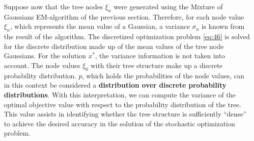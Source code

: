 Suppose now that the tree nodes $\xi_n$ were generated using the Mixture of Gaussians EM-algorithm of the previous section.
Therefore, for each node value $\xi_n$, which represents the mean value of a Gaussian, a variance $\sigma_n$ is known from the result of the algorithm.
The discretized optimization problem \eqref{eq:46} is solved for the discrete distribution made up of the mean values of the tree node Gaussians.
For the solution $x^*$, the variance information is not taken into account.
The node values $\xi_0$ with their tree structure make up a discrete probability distribution.
$p$, which holds the probabilities of the node values, can in this context be considered a \textbf{distribution over discrete probability distributions}.
With this interpretation, we can compute the variance of the optimal objective value with respect to the probability distribution of the tree.
This value assists in identifying whether the tree structure is sufficiently ``dense'' to achieve the desired accuracy in the solution of the stochastic optimization problem.

